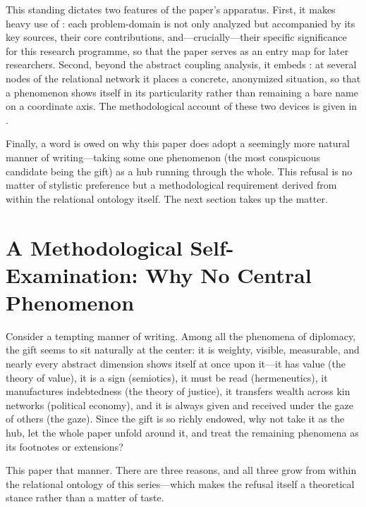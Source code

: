 This standing dictates two features of the paper's apparatus. First, it makes heavy use of : each problem-domain is not only analyzed but accompanied by its key sources, their core contributions, and---crucially---their specific significance for this research programme, so that the paper serves as an entry map for later researchers. Second, beyond the abstract coupling analysis, it embeds : at several nodes of the relational network it places a concrete, anonymized situation, so that a phenomenon shows itself in its particularity rather than remaining a bare name on a coordinate axis. The methodological account of these two devices is given in .

Finally, a word is owed on why this paper does  adopt a seemingly more natural manner of writing---taking some one phenomenon (the most conspicuous candidate being the gift) as a hub running through the whole. This refusal is no matter of stylistic preference but a methodological requirement derived from within the relational ontology itself. The next section takes up the matter.

\section{A Methodological Self-Examination: Why No Central Phenomenon}

Consider a tempting manner of writing. Among all the phenomena of diplomacy, the gift seems to sit naturally at the center: it is weighty, visible, measurable, and nearly every abstract dimension shows itself at once upon it---it has value (the theory of value), it is a sign (semiotics), it must be read (hermeneutics), it manufactures indebtedness (the theory of justice), it transfers wealth across kin networks (political economy), and it is always given and received under the gaze of others (the gaze). Since the gift is so richly endowed, why not take it as the hub, let the whole paper unfold around it, and treat the remaining phenomena as its footnotes or extensions?

This paper  that manner. There are three reasons, and all three grow from within the relational ontology of this series---which makes the refusal itself a theoretical stance rather than a matter of taste.

